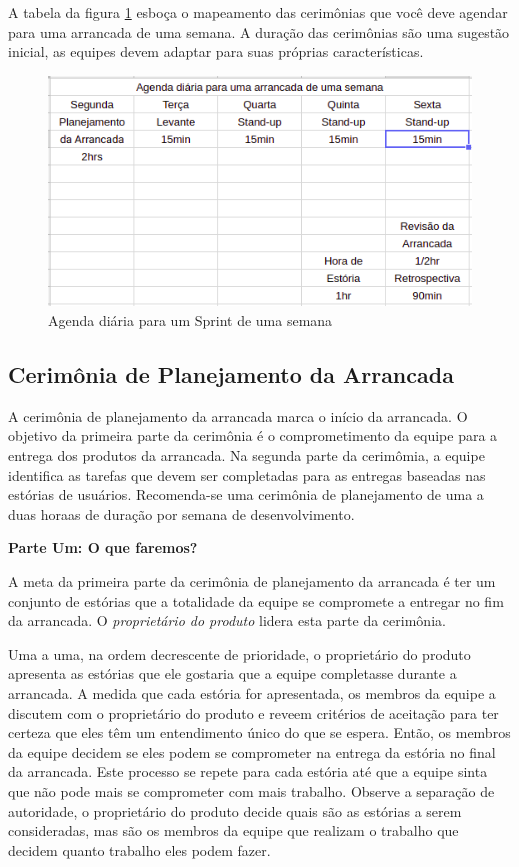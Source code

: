 A tabela da figura \ref{fig:sprint} esboça o mapeamento das cerimônias que você deve agendar para uma arrancada de uma semana. A duração das cerimônias são uma sugestão inicial, as equipes devem adaptar para suas próprias características.

\begin{figure}[h]
\begin{center}
\includegraphics[scale=0.6]{sprint_planning.png}
\caption{Agenda diária para um Sprint de uma semana} \label{fig:sprint}
\end{center}
\end{figure}

\subsection{Cerimônia de Planejamento da Arrancada}

A cerimônia de planejamento da arrancada marca o início da arrancada. O objetivo da primeira parte da cerimônia é o comprometimento da equipe para a entrega dos produtos da arrancada. Na segunda parte da cerimômia, a equipe identifica as tarefas que devem ser completadas para as entregas baseadas nas estórias de usuários. Recomenda-se uma cerimônia de planejamento de uma a duas horaas de duração por semana de desenvolvimento.

\noindent \textbf{\small Parte Um: O que faremos?}

A meta da primeira parte da cerimônia de planejamento da arrancada é ter um conjunto de estórias que a totalidade da equipe se compromete a entregar no fim da arrancada. O \emph{proprietário do produto} lidera esta parte da cerimônia.

Uma a uma, na ordem decrescente de prioridade, o proprietário do produto apresenta as estórias que ele gostaria que a equipe completasse durante a arrancada. A medida que cada estória for apresentada, os membros da equipe a discutem com o proprietário do produto e reveem critérios de aceitação para ter certeza que eles têm um entendimento único do que se espera. Então, os membros da equipe decidem se eles podem se comprometer na entrega da estória no final da arrancada. Este processo se repete para cada estória até que a equipe sinta que não pode mais se comprometer com mais trabalho. Observe a separação de autoridade, o proprietário do produto decide quais são as estórias a serem consideradas, mas são os membros da equipe que realizam o trabalho que decidem quanto trabalho eles podem fazer.

